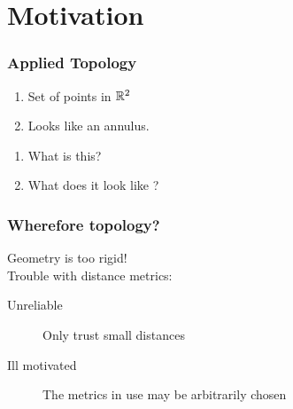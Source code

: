 \section{Motivation}
\begin{frame}
\frametitle{Applied Topology}
\begin{minipage}{0.45\columnwidth}%
\end{minipage}%
\begin{minipage}{0.55\columnwidth}%
\begin{enumerate}
\item<1->{ Set of points in $\mathbb{R}^2$}
\item<2->{ Looks like an annulus.}
\end{enumerate}
\end{minipage}
\begin{enumerate}
\item[] What is this?
\item[] What does it look like ?
\end{enumerate}
\end{frame}
\begin{frame}
  \frametitle{Wherefore topology? }
  \begin{minipage}{.45\textwidth}
  \end{minipage}
  \begin{minipage}{.65\textwidth}
    Geometry is too rigid! \\
    \noindent Trouble with distance metrics:
    \begin{description}
    \item[Unreliable] Only trust small distances
    \item[Ill motivated] The metrics in use may be arbitrarily chosen
    \end{description}
    \end{minipage}
\end{frame}

